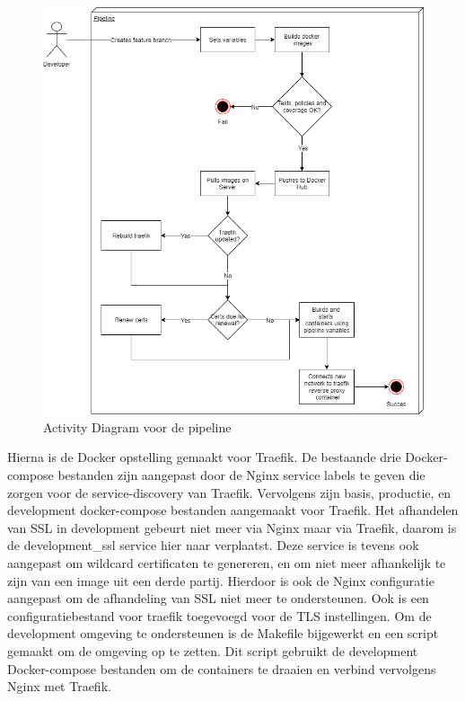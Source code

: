 \begin{figure}[H]
	\centering
	\includegraphics[width=13cm]{Figures/Activitydiagram}
	\decoRule
	\caption[Pipeline Activity Diagram]{Activity Diagram voor de pipeline}
	\label{activitydiagram}
\end{figure}

Hierna is de Docker opstelling gemaakt voor Traefik. De bestaande drie Docker-compose bestanden zijn aangepast door de Nginx service labels te geven die zorgen voor de service-discovery van Traefik. Vervolgens zijn basis, productie, en development docker-compose bestanden aangemaakt voor Traefik. Het afhandelen van SSL in development gebeurt niet meer via Nginx maar via Traefik, daarom is de development\_ssl service hier naar verplaatst. Deze service is tevens ook aangepast om wildcard certificaten te genereren, en om niet meer afhankelijk te zijn van een image uit een derde partij. Hierdoor is ook de Nginx configuratie aangepast om de afhandeling van SSL niet meer te ondersteunen. Ook is een configuratiebestand voor traefik toegevoegd voor de TLS instellingen. Om de development omgeving te ondersteunen is de Makefile bijgewerkt en een script gemaakt om de omgeving op te zetten. Dit script gebruikt de development Docker-compose bestanden om de containers te draaien en verbind vervolgens Nginx met Traefik.

